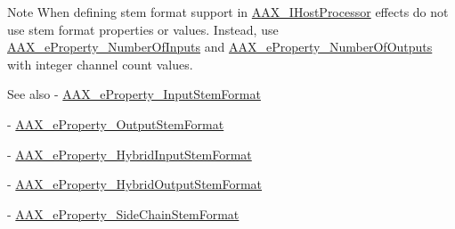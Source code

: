 \begin{DoxyNote}{Note}
When defining stem format support in \mbox{\hyperlink{a01833}{A\+A\+X\+\_\+\+I\+Host\+Processor}} effects do not use stem format properties or values. Instead, use \mbox{\hyperlink{a00662_a13e384f22825afd3db6d68395b79ce0da00ed3da39077c52ef259f350837fc981}{A\+A\+X\+\_\+e\+Property\+\_\+\+Number\+Of\+Inputs}} and \mbox{\hyperlink{a00662_a13e384f22825afd3db6d68395b79ce0dab7e07d482d3b6e527fc13bbc9f4eaf63}{A\+A\+X\+\_\+e\+Property\+\_\+\+Number\+Of\+Outputs}} with integer channel count values.
\end{DoxyNote}
\begin{DoxySeeAlso}{See also}
-\/ \mbox{\hyperlink{a00662_a13e384f22825afd3db6d68395b79ce0dadebf03028b758123965a8b988fa2df99}{A\+A\+X\+\_\+e\+Property\+\_\+\+Input\+Stem\+Format}} 

-\/ \mbox{\hyperlink{a00662_a13e384f22825afd3db6d68395b79ce0da211fdc6277e7fa652b5d482e810b0bc9}{A\+A\+X\+\_\+e\+Property\+\_\+\+Output\+Stem\+Format}} 

-\/ \mbox{\hyperlink{a00805_ga13e384f22825afd3db6d68395b79ce0da33a950bc2e02d38fc3be0a0ad8cc89b1}{A\+A\+X\+\_\+e\+Property\+\_\+\+Hybrid\+Input\+Stem\+Format}} 

-\/ \mbox{\hyperlink{a00805_ga13e384f22825afd3db6d68395b79ce0dac30a4e73772e37267dfef39ae3122705}{A\+A\+X\+\_\+e\+Property\+\_\+\+Hybrid\+Output\+Stem\+Format}} 

-\/ \mbox{\hyperlink{a00662_a13e384f22825afd3db6d68395b79ce0dae71ad10ce55fb8c4076fe70315b689ae}{A\+A\+X\+\_\+e\+Property\+\_\+\+Side\+Chain\+Stem\+Format}} 
\end{DoxySeeAlso}
